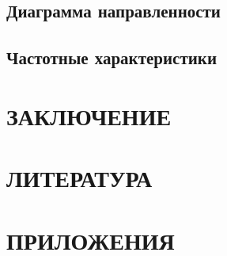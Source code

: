 \newpage
\subsection{Диаграмма направленности}

\newpage
\subsection{Частотные характеристики}

\newpage
\section*{ЗАКЛЮЧЕНИЕ}



\newpage
\section*{ЛИТЕРАТУРА}



\newpage
\section*{ПРИЛОЖЕНИЯ}



